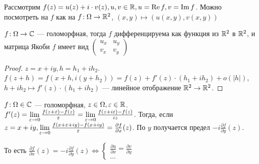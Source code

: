 Рассмотрим $f(z) = u(z) + i \cdot v(z), u, v \in \mathbb{R}, u = \operatorname{Re} f, v = \operatorname{Im} f$. Можно посмотреть на  $f$ как на  $f\!: \Omega \to \mathbb{R}^2$,  $(x, y) \mapsto \left(u(x, y), v(x, y)\right)$
 \begin{statement}
     $f\!: \Omega \to \mathbb{C}$ --- голоморфная, тогда  $f$ дифференцируема как функция из  $\mathbb{R}^2$ в  $\mathbb{R}^2$, и матрица Якоби  $f$ имеет вид  $\begin{pmatrix} u_x & u_y \\ v_x & v_y \end{pmatrix} $
\end{statement}
\begin{proof}
    $z = x+iy, h = h_1+ih_2$.
    $f(z+h) = f(x+h, i(y+h_2)) = f(z) + f'(z) \cdot (h_1 + ih_2) + o(|h|)$, $h+ih_2 \mapsto f'(z) \cdot (h_1 + ih_2)$ --- линейное отображение $\mathbb{R}^2 \to \mathbb{R}^2$.
\end{proof}

$f\!: \Omega \in \mathbb{C}$ --- голоморфная,  $z \in \Omega, \varepsilon \in \mathbb{R}$.  $f'(z) = \lim\limits_{\varepsilon \to 0} \frac{f(z+\varepsilon) - f(z)}{\varepsilon} = \lim\limits_{\varepsilon \to 0} \frac{f(z+i\varepsilon) -f(z)}{iz}$. Тогда, если $z = x+iy, \lim\limits_{\varepsilon \to 0} \frac{f(x+\varepsilon + iy) - f(x+iy)}{\varepsilon} = \frac{\partial f}{\partial x}(z)$. По $y$ получается предел  $-i \frac{\partial f}{\partial y}(z)$. 

То есть $\frac{\partial f}{\partial x}(z) = -i \frac{\partial f}{\partial y}(z) \iff \begin{cases}
    \frac{\partial u}{\partial x} = \frac{\partial v}{\partial y} \\ 
    \dots
\end{cases}$

